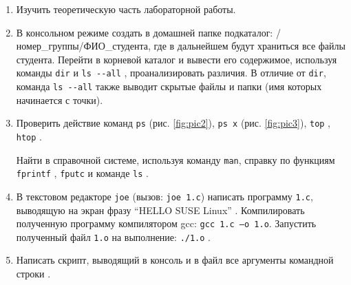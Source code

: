\begin{enumerate}[listparindent=\fivecharsapprox]

	\item Изучить теоретическую часть лабораторной работы.
	\item В консольном режиме создать в домашней папке подкаталог: /номер\_группы/ФИО\_студента, где в дальнейшем будут храниться все файлы студента.
		Перейти в корневой каталог и вывести его содержимое, используя команды \lstinline{dir} и \lstinline{ls --all} , проанализировать различия.
В отличие от \lstinline{dir}, команда \lstinline{ls --all} также выводит скрытые файлы и папки (имя которых начинается с точки).


	\item Проверить действие команд \lstinline{ps} (рис. \ref{fig:pic2}), \lstinline{ps x} (рис. \ref{fig:pic3}), \lstinline{top} , \lstinline{htop} .


Найти в справочной системе, используя команду \lstinline{man}, справку по функциям \lstinline{fprintf} , \lstinline{fputc}  и команде \lstinline{ls} .


	\item В текстовом редакторе \lstinline{joe} (вызов: \lstinline{joe 1.c}) написать программу \lstinline{1.c}, выводящую на экран фразу “HELLO SUSE Linux” . Компилировать полученную программу компилятором gcc: \lstinline{gcc 1.c –o 1.o}. Запустить полученный файл \lstinline{1.o} на выполнение: \lstinline{./1.o} .
		


	\item Написать скрипт, выводящий в консоль и в файл все аргументы командной строки .


\end{enumerate}
